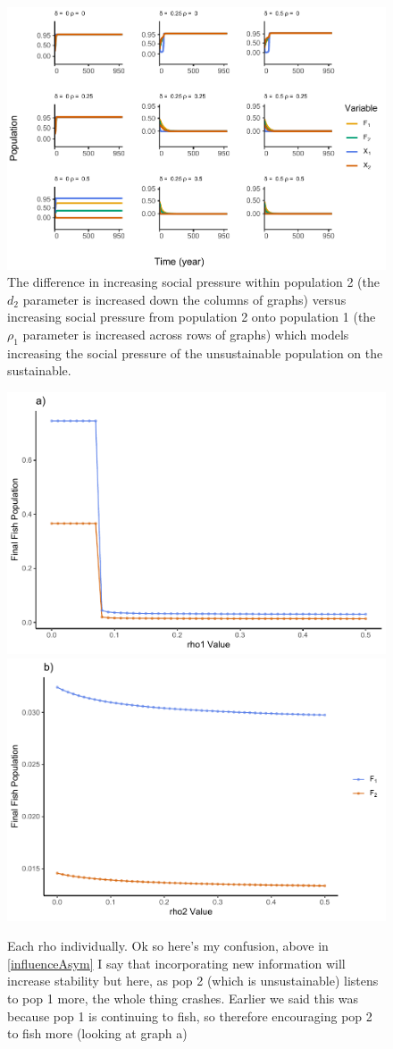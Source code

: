 \documentclass[
]{article}
\begin{document}
\begin{figure}
\centering
\includegraphics{ReviewerRhoTest_files/figure-latex/influencerho1-1.pdf}
\caption{\label{fig:influencerho1}The difference in increasing social pressure within population 2 (the \(d_2\) parameter is increased down the columns of graphs) versus increasing social pressure from population 2 onto population 1 (the \(\rho_1\) parameter is increased across rows of graphs) which models increasing the social pressure of the unsustainable population on the sustainable. \label{influenceRho1}}
\end{figure}



\begin{figure}
\includegraphics[width=0.5\linewidth]{ReviewerRhoTest_files/figure-latex/rhoExploreGraphEach-1} \includegraphics[width=0.5\linewidth]{ReviewerRhoTest_files/figure-latex/rhoExploreGraphEach-2} \caption{Each rho individually. Ok so here's my confusion, above in \ref{influenceAsym} I say that incorporating new information will increase stability but here, as pop 2 (which is unsustainable) listens to pop 1 more, the whole thing crashes. Earlier we said this was because pop 1 is continuing to fish, so therefore encouraging pop 2 to fish more (looking at graph a) \label{rhoExploreGraphEach}}\label{fig:rhoExploreGraphEach}
\end{figure}
\end{document}

